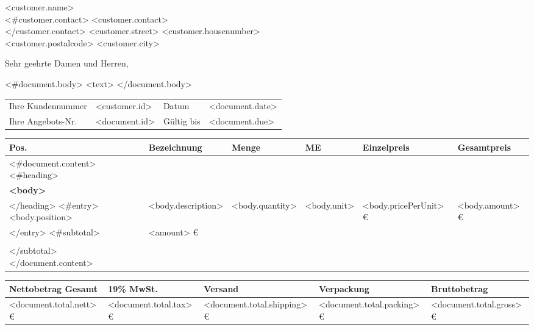 \documentclass[DIN, pagenumber=footmiddle, parskip=half,
fromalign=right,  %
fromphone=true, fromfax=false,
fromrule=false]{scrlttr2}
\begin{document}
\begin{letter}{
<customer.name>\\
<#customer.contact>
<customer.contact>\\
</customer.contact>
<customer.street> <customer.housenumber>\\
<customer.postalcode> <customer.city>
}

\opening{Sehr geehrte Damen und Herren,}
<#document.body>
<text>
\newline
</document.body>

\newpage

\begin{longtable}{p{4cm}p{5.5cm}p{2cm}p{4cm}}
Ihre Kundennummer & <customer.id> & Datum & <document.date>\\
Ihre Angebots-Nr. & <document.id> & Gültig bis & <document.due>\\
\end{longtable}

\begin{longtable}{p{0.5cm}p{5.5cm}p{1cm}p{1cm}p{2.5cm}p{2.5cm}}
\hline
Pos. & Bezeichnung & Menge & ME & Einzelpreis & Gesamtpreis\\
\hline
<#document.content>
  <#heading>
    \\
    \multicolumn{6}{l}{\textbf{<body>}}\\
  </heading>
  <#entry>
    <body.position> & <body.description> & <body.quantity> & <body.unit> & <body.pricePerUnit> \euro{} & <body.amount> \euro{}\\
  </entry>
  <#subtotal>
    \multicolumn{5}{r}{<body>} & <amount> \euro{}\\
    \\
  </subtotal>
</document.content>
\hline
\hline 
\end{longtable}

\begin{longtable}{p{5.5cm}p{2.5cm}p{2.5cm}p{2cm}p{3cm}}
\hline Nettobetrag Gesamt & 19\% MwSt. & Versand & Verpackung & Bruttobetrag\\
\hline 
<document.total.nett> \euro{} & <document.total.tax> \euro & <document.total.shipping> \euro & <document.total.packing> \euro & <document.total.gross> \euro{}\\
\hline\hline 	
\end{longtable}

\end{letter}
\end{document}
